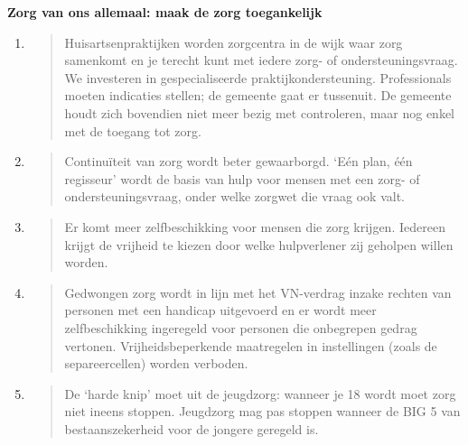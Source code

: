 \textbf{Zorg van ons allemaal: maak de zorg toegankelijk}

\begin{enumerate}
\def\labelenumi{\arabic{enumi}.}
\item
  \begin{quote}
  Huisartsenpraktijken worden zorgcentra in de wijk waar zorg samenkomt
  en je terecht kunt met iedere zorg- of ondersteuningsvraag. We
  investeren in gespecialiseerde praktijkondersteuning. Professionals
  moeten indicaties stellen; de gemeente gaat er tussenuit. De gemeente
  houdt zich bovendien niet meer bezig met controleren, maar nog enkel
  met de toegang tot zorg.
  \end{quote}
\item
  \begin{quote}
  Continuïteit van zorg wordt beter gewaarborgd. `Eén plan, één
  regisseur' wordt de basis van hulp voor mensen met een zorg- of
  ondersteuningsvraag, onder welke zorgwet die vraag ook valt.
  \end{quote}
\item
  \begin{quote}
  Er komt meer zelfbeschikking voor mensen die zorg krijgen. Iedereen
  krijgt de vrijheid te kiezen door welke hulpverlener zij geholpen
  willen worden.
  \end{quote}
\item
  \begin{quote}
  Gedwongen zorg wordt in lijn met het VN-verdrag inzake rechten van
  personen met een handicap uitgevoerd en er wordt meer zelfbeschikking
  ingeregeld voor personen die onbegrepen gedrag vertonen.
  Vrijheidsbeperkende maatregelen in instellingen (zoals de
  separeercellen) worden verboden.
  \end{quote}
\item
  \begin{quote}
  De `harde knip' moet uit de jeugdzorg: wanneer je 18 wordt moet zorg
  niet ineens stoppen. Jeugdzorg mag pas stoppen wanneer de BIG 5 van
  bestaanszekerheid voor de jongere geregeld is.
  \end{quote}
\end{enumerate}

